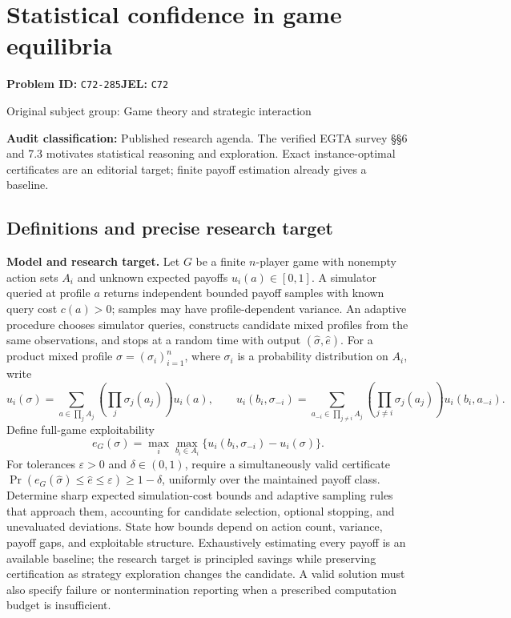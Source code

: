 \documentclass[11pt,a4paper]{article}
\begin{document}
\section*{Statistical confidence in game equilibria}
\textbf{Problem ID:} \texttt{C72-285}\quad \textbf{JEL:} \texttt{C72}\par
\label{problem:OP-0288}
{\sffamily\small\color{muted}Original subject group: Game theory and strategic interaction\par}
\label{definitions:problem:30007570}
\textbf{Audit classification:} Published research agenda. The verified EGTA survey §§6 and 7.3 motivates statistical reasoning and exploration. Exact instance-optimal certificates are an editorial target; finite payoff estimation already gives a baseline.
\subsection*{Definitions and precise research target}
\textbf{Model and research target.} Let \(G\) be a finite \(n\)-player game with nonempty action sets \(A_i\) and unknown expected payoffs \(u_i(a)\in[0,1]\). A simulator queried at profile \(a\) returns independent bounded payoff samples with known query cost \(c(a)>0\); samples may have profile-dependent variance. An adaptive procedure chooses simulator queries, constructs candidate mixed profiles from the same observations, and stops at a random time with output \((\widehat\sigma,\widehat e)\). For a product mixed profile \(\sigma=(\sigma_i)_{i=1}^n\), where \(\sigma_i\) is a probability distribution on \(A_i\), write
\[
 u_i(\sigma)=\sum_{a\in\prod_j A_j}\left(\prod_j\sigma_j(a_j)\right)u_i(a),\qquad
 u_i(b_i,\sigma_{-i})=\sum_{a_{-i}\in\prod_{j\ne i}A_j}\left(\prod_{j\ne i}\sigma_j(a_j)\right)u_i(b_i,a_{-i}).
\]
Define full-game exploitability
\[
 e_G(\sigma)=\max_i\max_{b_i\in A_i}
 \{u_i(b_i,\sigma_{-i})-u_i(\sigma)\}.
\]
For tolerances \(\varepsilon>0\) and \(\delta\in(0,1)\), require a simultaneously valid certificate \(\Pr(e_G(\widehat\sigma)\leq\widehat e\leq\varepsilon)\geq1-\delta\), uniformly over the maintained payoff class. Determine sharp expected simulation-cost bounds and adaptive sampling rules that approach them, accounting for candidate selection, optional stopping, and unevaluated deviations. State how bounds depend on action count, variance, payoff gaps, and exploitable structure. Exhaustively estimating every payoff is an available baseline; the research target is principled savings while preserving certification as strategy exploration changes the candidate. A valid solution must also specify failure or nontermination reporting when a prescribed computation budget is insufficient.
\end{document}
